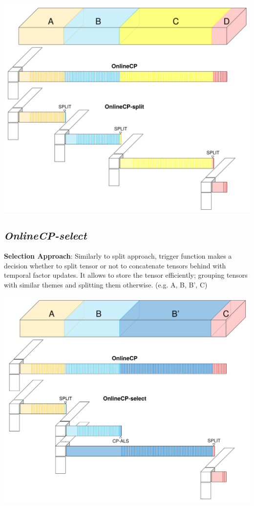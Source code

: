 \begin{center}
	\includegraphics[width=1\textwidth]{FIG/OnlineCP-split.png}
\end{center}

\newpage
\subsection{\em OnlineCP-select}
\textbf{Selection Approach}: Similarly to split approach, trigger function makes a decision whether to split tensor or not to concatenate tensors behind with temporal factor updates. It allows to store the tensor efficiently; grouping tensors with similar themes and splitting them otherwise. (e.g. A, B, B’, C)

\begin{center}
	\includegraphics[width=1\textwidth]{FIG/OnlineCP-select.png}
\end{center}